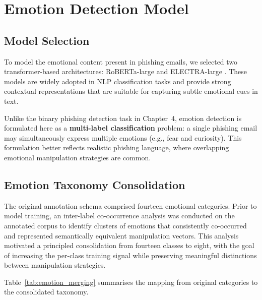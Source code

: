 \chapter{Emotion Detection Model}
\label{chapter:emotion_model}

\section{Model Selection}
To model the emotional content present in phishing emails, we selected two transformer-based architectures: \acs{RoBERTa}-large \cite{liu2019roberta} and \acs{ELECTRA}-large \cite{clark2020electra}. These models are widely adopted in \acs{NLP} classification tasks and provide strong contextual representations that are suitable for capturing subtle emotional cues in text.

Unlike the binary phishing detection task in Chapter~4, emotion detection is formulated here as a \textbf{multi-label classification} problem: a single phishing email may simultaneously express multiple emotions (e.g., fear and curiosity). This formulation better reflects realistic phishing language, where overlapping emotional manipulation strategies are common.

\section{Emotion Taxonomy Consolidation}
\label{sec:emotion_taxonomy}

The original annotation schema comprised fourteen emotional categories. Prior to model training, an inter-label co-occurrence analysis was conducted on the annotated corpus to identify clusters of emotions that consistently co-occurred and represented semantically equivalent manipulation vectors. This analysis motivated a principled consolidation from fourteen classes to eight, with the goal of increasing the per-class training signal while preserving meaningful distinctions between manipulation strategies.

Table~\ref{tab:emotion_merging} summarises the mapping from original categories to the consolidated taxonomy.

